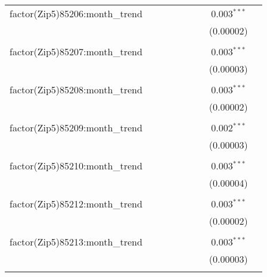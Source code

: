 \begin{table}[H]
{\begin{tabular}{@{\extracolsep{5pt}}lcccccccc}
  factor(Zip5)85206:month\_trend &  &  &  &  &  &  & 0.003$^{***}$ &  \\  

   &  &  &  &  &  &  & (0.00002) &  \\  

   & & & & & & & & \\  

  factor(Zip5)85207:month\_trend &  &  &  &  &  &  & 0.003$^{***}$ &  \\  

   &  &  &  &  &  &  & (0.00003) &  \\  

   & & & & & & & & \\  

  factor(Zip5)85208:month\_trend &  &  &  &  &  &  & 0.003$^{***}$ &  \\  

   &  &  &  &  &  &  & (0.00002) &  \\  

   & & & & & & & & \\  

  factor(Zip5)85209:month\_trend &  &  &  &  &  &  & 0.002$^{***}$ &  \\  

   &  &  &  &  &  &  & (0.00003) &  \\  

   & & & & & & & & \\  

  factor(Zip5)85210:month\_trend &  &  &  &  &  &  & 0.003$^{***}$ &  \\  

   &  &  &  &  &  &  & (0.00004) &  \\  

   & & & & & & & & \\  

  factor(Zip5)85212:month\_trend &  &  &  &  &  &  & 0.003$^{***}$ &  \\  

   &  &  &  &  &  &  & (0.00002) &  \\  

   & & & & & & & & \\  

  factor(Zip5)85213:month\_trend &  &  &  &  &  &  & 0.003$^{***}$ &  \\  

   &  &  &  &  &  &  & (0.00003) &  \\  

   & & & & & & & & \\  


\end{tabular}}
\end{table}
